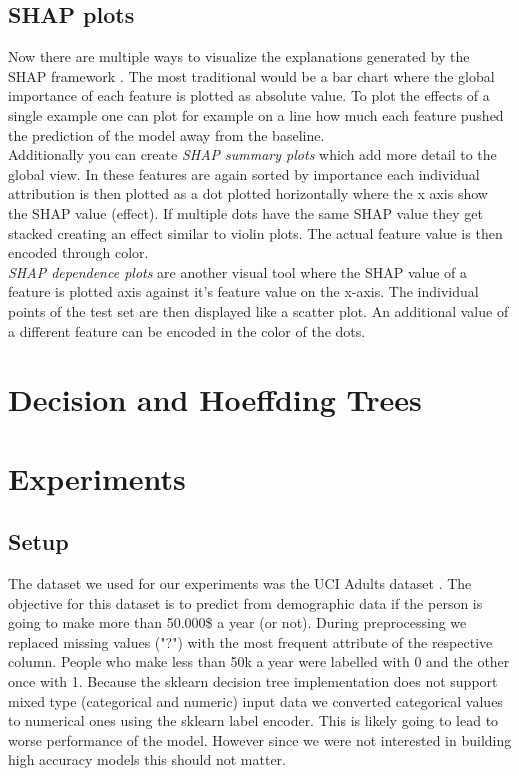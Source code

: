 \documentclass[conference]{IEEEtran}
\begin{document}
\subsection{SHAP plots}
Now there are multiple ways to visualize the explanations generated by the SHAP framework \cite{b1}.
The most traditional would be a bar chart where the global importance of each feature is plotted as absolute value. To plot the effects of a single example one can plot for example on a line how much each feature pushed the prediction of the model away from the baseline.\\
Additionally you can create \textit{SHAP summary plots} which add more detail to the global view. In these features are again sorted by importance each individual attribution is then plotted as a dot plotted horizontally where the x axis show the SHAP value (effect). If multiple dots have the same SHAP value they get stacked creating an effect similar to violin plots. The actual feature value is then encoded through color.\\
\textit{SHAP dependence plots} are another visual tool where the SHAP value of a feature is plotted axis against it's feature value on the x-axis. The individual points of the test set are then displayed like a scatter plot. An additional value of a different feature can be encoded in the color of the dots.


\section{Decision and Hoeffding Trees}
\label{Trees}


\section{Experiments}
\label{Experiments}

\subsection{Setup}
The dataset we used for our experiments was the UCI Adults dataset \cite{b15}. 
The objective for this dataset is to predict from demographic data if the person is going to make more than 50.000\$ a year (or not).
During preprocessing we replaced missing values ("?")  with the most frequent attribute of the respective column.
People who make less than 50k a year were labelled with 0 and the other once with 1.
Because the sklearn decision tree implementation does not support mixed type (categorical and numeric) input data we converted categorical values to numerical ones using the sklearn label encoder. 
This is likely going to lead to worse performance of the model.
However since we were not interested in building high accuracy models this should not matter.\\
\end{document}

